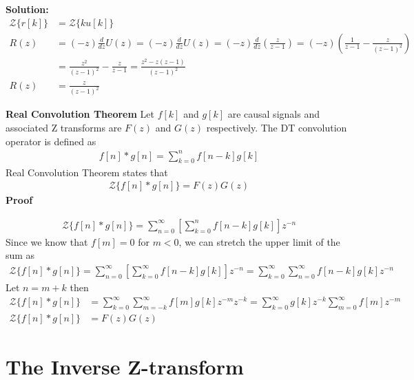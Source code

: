 \documentclass[twoside]{article}
\begin{document}
\textbf{Solution:}
%
\begin{align*}
\mathcal{Z} \lbrace r[k] \rbrace &= \mathcal{Z} \lbrace k u[k] \rbrace  
\\
R(z) &= (- z) \frac{d}{dz} U(z) = (- z) \frac{d}{dz} U(z) =  (- z)
       \frac{d}{dz} \left( \frac{z}{z-1} \right)
       =  (- z) \left( \frac{1}{z-1} - \frac{z}{(z-1)^2} \right)
\\
&= \frac{z^2}{(z-1)^2} - \frac{z}{z-1} = \frac{z^2 - z(z-1)}{(z-1)^2}
\\
R(z) &= \frac{z}{(z-1)^2}
\end{align*}


\textbf{Real Convolution Theorem}
%
Let $f[k]$ and $g[k]$ are causal signals and associated Z transforms
are $F(z)$ and $G(z)$ respectively.
%
The DT convolution operator is defined as
%
\begin{align*}
 f[n] \ast g[n] = \sum\limits_{k=0}^{n} f[n-k] g[k]
\end{align*}
%
Real Convolution Theorem states that
%
\begin{align*}
 \mathcal{Z} \lbrace f[n] \ast g[n] \rbrace = F(z) G(z)
\end{align*}
%
\textbf{Proof}

\begin{align*}
 \mathcal{Z} \lbrace f[n] \ast g[n] \rbrace =
  \sum\limits_{n=0}^{\infty} \left [ \sum\limits_{k=0}^{n} f[n-k] g[k]
  \right] z^{-n}
\end{align*}
%
Since we know that $f[m] = 0$ for $m<0$, we can stretch the upper
limit of the sum as
%
\begin{align*}
 \mathcal{Z} \lbrace f[n] \ast g[n] \rbrace =
  \sum\limits_{n=0}^{\infty} \left [ \sum\limits_{k=0}^{\infty} f[n-k] g[k]
  \right] z^{-n}
 = \sum\limits_{k=0}^{\infty} \sum\limits_{n=0}^{\infty}  f[n-k] g[k] z^{-n}
\end{align*}
%
Let $n = m + k$ then 
%
\begin{align*}
 \mathcal{Z} \lbrace f[n] \ast g[n] \rbrace &=
  \sum\limits_{k=0}^{\infty}  \sum\limits_{m=-k}^{\infty} f[m] g[k]
  z^{-m} z^{-k}
  = \sum\limits_{k=0}^{\infty} g[k] z^{-k} \sum\limits_{m=0}^{\infty}
  f[m] z^{-m} 
\\
 \mathcal{Z} \lbrace f[n] \ast g[n] \rbrace &= F(z) G(z) 
\end{align*}
%

\section*{The Inverse Z-transform}
\end{document}
